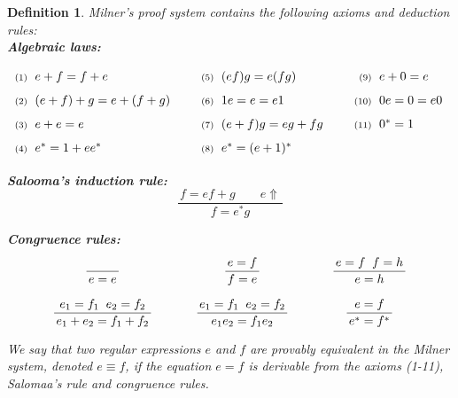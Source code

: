 \documentclass{article}
\newtheorem{definition}{Definition}[section]
\begin{document}
\begin{definition} \emph{Milner's proof system} 
    contains the following axioms and deduction rules:~\\
    
\textbf{Algebraic laws:}
\[
\renewcommand{\arraystretch}{1.6} %
\begin{array}{@{\hspace{3pt}}r@{\hspace{6pt}}l
                  @{\hspace{25pt}}r@{\hspace{6pt}}l
                  @{\hspace{25pt}}r@{\hspace{6pt}}l}
\text{\scriptsize (1)}  & e + f = f + e            
  & \text{\scriptsize (5)}  & (ef)g = e(fg)         
  & \text{\scriptsize (9)}  & e + 0 = e \\

\text{\scriptsize (2)}  & (e + f) + g = e + (f + g) 
  & \text{\scriptsize (6)}  & 1e = e = e1           
  & \text{\scriptsize (10)} & 0e = 0 = e0 \\

\text{\scriptsize (3)}  & e + e = e                 
  & \text{\scriptsize (7)}  & (e+f)g = eg + fg      
  & \text{\scriptsize (11)} & 0^* = 1 \\

\text{\scriptsize (4)}  & e^* = 1 + e e^*           
  & \text{\scriptsize (8)}  & e^* = (e+1)^*         
  &                     & 
\end{array}
\]

\textbf{Salooma's induction rule:}
\vspace{.5em}
\[
\frac{\, f= ef + g\qquad e\Uparrow\,}{\,f=e^*g\,}
\]

\textbf{Congruence rules:}
\[
\renewcommand{\arraystretch}{1.8}
\begin{array}{c@{\hspace{35pt}}c@{\hspace{35pt}}c}
\dfrac{}{\,e = e\,} 
  & \dfrac{\,e = f\,}{\,f = e\,} 
  & \dfrac{\,e = f \;\; f = h\,}{\,e = h\,} \\[12pt]
\dfrac{\,e_1 = f_1 \;\; e_2 = f_2\,}{\,e_1 + e_2 = f_1 + f_2\,}
  & \dfrac{\,e_1 = f_1 \;\; e_2 = f_2\,}{\,e_1 e_2 = f_1 e_2\,}
  & \dfrac{\,e = f\,}{\,e^{*} = f^{*}\,}
\end{array}
\]
\vspace{1em}

We say that two regular expressions $e$ and $f$ are \emph{provably equivalent} in the Milner system, denoted $e \equiv f$, if the equation $e = f$ is derivable from the axioms (1-11), Salomaa's  rule and congruence rules.
\end{definition}
\end{document}
